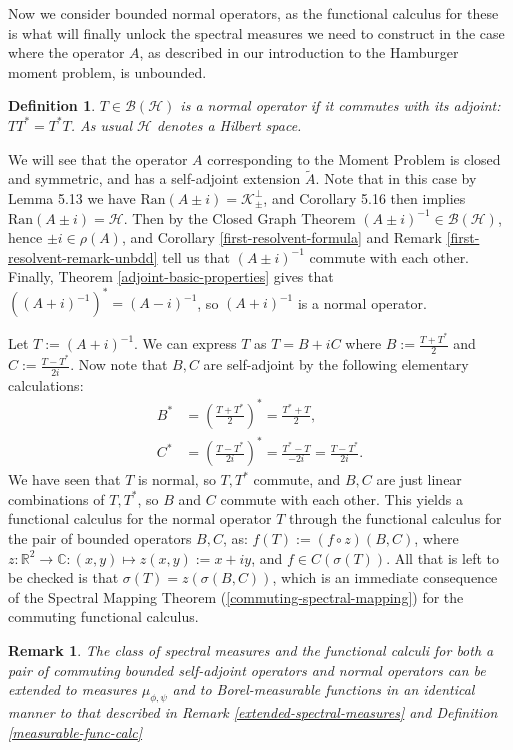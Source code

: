 \documentclass[12pt,oneside]{report}
\newtheorem{defn}[thm]{Definition}
\newtheorem{rem}[thm]{Remark}
\begin{document}
Now we consider bounded normal operators, as the functional calculus for these is what will finally unlock the spectral measures we need to construct in the case where the operator $A$, as described in our introduction to the Hamburger moment problem, is unbounded.

\begin{defn}
    $T \in \mathscr{B}(\mathscr{H})$ is a normal operator if it commutes with its adjoint: $TT^*=T^*T$. As usual $\mathscr{H}$ denotes a Hilbert space.
\end{defn}

We will see that the operator $A$ corresponding to the Moment Problem is closed and symmetric, and has a self-adjoint extension $\tilde{A}$. Note that in this case by Lemma 5.13 we have $\mathrm{Ran}(A \pm i) = \mathscr{K}_{\pm}^{\perp}$, and Corollary 5.16 then implies $\mathrm{Ran}(A\pm i) = \mathscr{H}$. Then by the Closed Graph Theorem $(A \pm i)^{-1} \in \mathscr{B}(\mathscr{H})$, hence $\pm i \in \rho(A)$, and Corollary \ref{first-resolvent-formula} and Remark \ref{first-resolvent-remark-unbdd} tell us that $(A \pm i)^{-1}$ commute with each other. Finally, Theorem \ref{adjoint-basic-properties} gives that $((A + i)^{-1})^{*} = (A - i)^{-1}$, so $(A + i)^{-1}$ is a normal operator.

Let $T := (A + i)^{-1}$. We can express $T$ as $T = B + iC$ where $B := \frac{T + T^{*}}{2}$ and $C := \frac{T - T^{*}}{2i}$. Now note that $B,C$ are self-adjoint by the following elementary calculations:
\begin{align*}
B^{*} &= \left( \frac{T+T^{*}}{2} \right)^{*} = \frac{T^{*} + T}{2}, \\
C^{*} &= \left( \frac{T - T^{*}}{2i} \right)^{*} = \frac{T^{*} - T}{-2i} = \frac{T - T^{*}}{2i}.
\end{align*}
We have seen that $T$ is normal, so $T,T^{*}$ commute, and $B,C$ are just linear combinations of $T,T^{*}$, so $B$ and $C$ commute with each other. This yields a functional calculus for the normal operator $T$ through the functional calculus for the pair of bounded operators $B,C$, as: $f(T) := (f \circ z)(B,C)$, where $z: \mathbb{R}^{2} \to \mathbb{C}: (x,y) \mapsto z(x,y) := x + iy$, and $f \in C(\sigma(T))$. All that is left to be checked is that $\sigma(T) = z(\sigma(B,C))$, which is an immediate consequence of the Spectral Mapping Theorem (\ref{commuting-spectral-mapping}) for the commuting functional calculus.

\begin{rem}
    The class of spectral measures and the functional calculi for both a pair of commuting bounded self-adjoint operators and normal operators can be extended to measures $\mu_{\phi,\psi}$ and to Borel-measurable functions in an identical manner to that described in Remark \ref{extended-spectral-measures} and Definition \ref{measurable-func-calc}
\end{rem}
\end{document}
